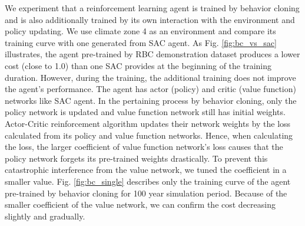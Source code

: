 \documentclass{article}
\begin{document}
We experiment that a reinforcement learning agent is trained by behavior cloning and is also additionally trained by its own interaction with the environment and policy updating. We use climate zone 4 as an environment and compare its training curve with one generated from SAC agent. As Fig. \ref{fig:bc_vs_sac} illustrates, the agent pre-trained by RBC demonstration dataset produces a lower cost (close to 1.0) than one SAC provides at the beginning of the training duration. However, during the training, the additional training does not improve the agent's performance. The agent has actor (policy) and critic (value function) networks like SAC agent. In the pertaining process by behavior cloning, only the policy network is updated and value function network still has initial weights. Actor-Critic reinforcement algorithm updates their network weights by the loss calculated from its policy and value function networks.\cite{Sutton00policygradient} Hence, when calculating the loss, the larger coefficient of value function network's loss causes that the policy network forgets its pre-trained weights drastically.\cite{jena2020augmenting} To prevent this catastrophic interference from the value network, we tuned the coefficient in a smaller value. Fig. \ref{fig:bc_single} describes only the training curve of the agent pre-trained by behavior cloning for 100 year simulation period. Because of the smaller coefficient of the value network, we can confirm the cost decreasing slightly and gradually.
\end{document}
